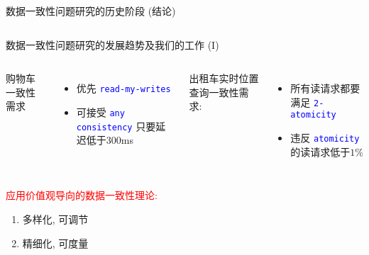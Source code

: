 \begin{frame}{数据一致性问题研究的历史阶段 (结论)}
  \begin{center}

  \end{center}

  \vspace{0.30cm}

  \begin{columns}[t]
  \end{columns}
\end{frame}
\begin{frame}{数据一致性问题研究的发展趋势及我们的工作 (I)}
  \begin{columns}[t]
	  购物车一致性需求 %
	  \begin{itemize}
		\item 优先 \textcolor{blue}{\texttt{\small read-my-writes}}
		\item 可接受 \textcolor{blue}{\texttt{\small any consistency}} 只要延迟低于300ms
	  \end{itemize}
	  出租车实时位置查询一致性需求:
	  \begin{itemize}
		\item 所有读请求都要满足 \textcolor{blue}{\texttt{\small 2-atomicity}}
		\item 违反 \textcolor{blue}{\texttt{\small atomicity}} 的读请求低于$1\%$ 
	  \end{itemize}
  \end{columns}

  \pause
  \vspace{1.00cm}

  \textcolor{red}{应用价值观导向的数据一致性理论:}
  \begin{enumerate}
	\item 多样化, 可调节
	\item 精细化, 可度量
  \end{enumerate}
\end{frame}
